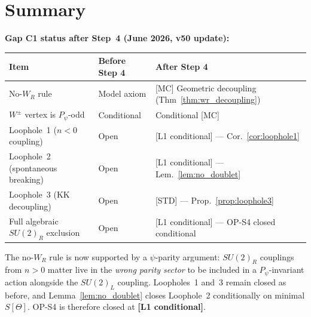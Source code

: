 \documentclass[12pt,a4paper]{article}
\theoremstyle{definition}
\theoremstyle{remark}
\begin{document}
\section{Summary}
\label{sec:summary}

\begin{resultbox}
  \textbf{Gap C1 status after Step~4 (June 2026, v50 update):}
  \begin{center}
  \begin{tabular}{lll}
    \toprule
    \textbf{Item} & \textbf{Before Step 4} & \textbf{After Step 4} \\
    \midrule
    No-$W_R$ rule & Model axiom & [MC] Geometric decoupling (Thm~\ref{thm:wr_decoupling}) \\
    $W^\pm$ vertex is $P_\psi$-odd & Conditional & Conditional [MC] \\
    Loophole~1 ($n<0$ coupling) & Open & [L1 conditional] — Cor.~\ref{cor:loophole1} \\
    Loophole~2 (spontaneous breaking) & Open & [L1 conditional] — Lem.~\ref{lem:no_doublet} \\
    Loophole~3 (KK decoupling) & Open & [STD] — Prop.~\ref{prop:loophole3} \\
    Full algebraic $SU(2)_R$ exclusion & Open & [L1 conditional] — OP-S4 closed conditional \\
    \bottomrule
  \end{tabular}
  \end{center}

  The no-$W_R$ rule is now supported by a $\psi$-parity argument:
  $SU(2)_R$ couplings from $n>0$ matter live in the \emph{wrong parity sector}
  to be included in a $P_\psi$-invariant action alongside the $SU(2)_L$ coupling.
  Loopholes~1 and~3 remain closed as before, and Lemma~\ref{lem:no_doublet}
  closes Loophole~2 conditionally on minimal $S[\Theta]$.
  OP-S4 is therefore closed at \textbf{[L1 conditional]}.
\end{resultbox}

\ifdefined\INCLUDEMODE
\else
\end{document}
